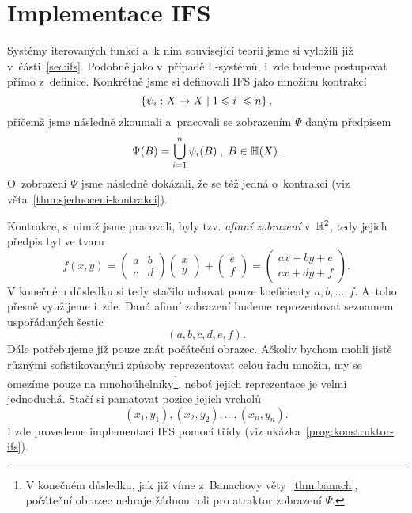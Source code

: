 \section{Implementace IFS}\label{sec:implementace-ifs}

Systémy iterovaných funkcí a~k nim související teorii jsme si vyložili již v~části~\ref{sec:ifs}. Podobně jako v~případě L-systémů, i~zde budeme postupovat přímo z~definice. Konkrétně jsme si definovali IFS jako množinu kontrakcí
\[\left\{\psi_i:X \rightarrow X\mid 1\leqslant i~\leqslant n\right\},\]
přičemž jsme následně zkoumali a~pracovali se zobrazením $\Psi$ daným předpisem
\[\Psi(B)=\bigcup_{i=1}^n\psi_i(B)\;,\;B\in\mathbb{H}(X).\]
O~zobrazení $\Psi$ jsme následně dokázali, že se též jedná o~kontrakci (viz věta~\ref{thm:sjednoceni-kontrakci}).

Kontrakce, s~nimiž jsme pracovali, byly tzv. \emph{afinní zobrazení} v~$\mathbb{R}^2$, tedy jejich předpis byl ve tvaru
\begin{equation}\label{eq:afinni-zobrazeni}
    f(x,y)=\left(\begin{matrix}
        a & b\\
        c & d
    \end{matrix}\right)\left(\begin{matrix}
        x\\
        y
    \end{matrix}\right)+\left(\begin{matrix}
        e\\
        f
    \end{matrix}\right)=\left(\begin{matrix}
        ax+by+e\\
        cx+dy+f
    \end{matrix}\right).
\end{equation}
V konečném důsledku si tedy stačilo uchovat pouze koeficienty $a,b,\ldots,f$. A~toho přesně využijeme i~zde. Daná afinní zobrazení budeme reprezentovat seznamem uspořádaných šestic
\[(a,b,c,d,e,f).\]
Dále potřebujeme již pouze znát počáteční obrazec. Ačkoliv bychom mohli jistě různými sofistikovanými způsoby reprezentovat celou řadu množin, my se omezíme pouze na mnohoúhelníky\footnote{V konečném důsledku, jak již víme z~Banachovy věty~\ref{thm:banach}, počáteční obrazec nehraje žádnou roli pro atraktor zobrazení $\Psi$.}, neboť jejich reprezentace je velmi jednoduchá. Stačí si pamatovat pozice jejich vrcholů
\[(x_1,y_1),(x_2,y_2),\ldots,(x_n,y_n).\]
I zde provedeme implementaci IFS pomocí třídy (viz ukázka~\ref{prog:konstruktor-ifs}).
